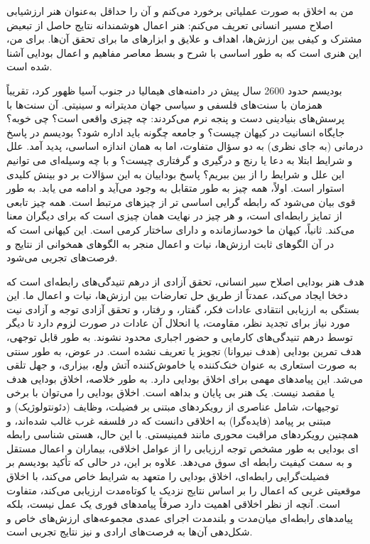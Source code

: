 من به اخلاق به صورت عملیاتی برخورد می‌کنم و آن را حداقل به‌عنوان هنر ارزشیابی اصلاح مسیر انسانی تعریف می‌کنم: هنر اعمال هوشمندانه نتایج حاصل از تبعیض مشترک و کیفی بین ارزش‌ها، اهداف و علایق و ابزارهای ما برای تحقق آن‌ها.
برای من، این هنری است که به طور اساسی با شرح و بسط معاصر مفاهیم و اعمال بودایی آشنا شده است.

بودیسم حدود 2600 سال پیش در دامنه‌های هیمالیا در جنوب آسیا ظهور کرد، تقریباً همزمان با سنت‌های فلسفی و سیاسی جهان مدیترانه و سینیتی.
آن سنت‌ها با پرسش‌های بنیادینی دست و پنجه نرم می‌کردند: چه چیزی واقعی است؟ چی خوبه؟ جایگاه انسانیت در کیهان چیست؟ و جامعه چگونه باید اداره شود؟ بودیسم در پاسخ درمانی (به جای نظری) به دو سؤال متفاوت، اما به همان اندازه اساسی، پدید آمد.
علل و شرایط ابتلا به دعا یا رنج و درگیری و گرفتاری چیست؟ و با چه وسیله‌ای می توانیم این علل و شرایط را از بین ببریم؟ پاسخ بوداییان به این سؤالات بر دو بینش کلیدی استوار است.
اولاً، همه چیز به طور متقابل به وجود می‌آید و ادامه می یابد.
به طور قوی بیان می‌شود که رابطه گرایی اساسی تر از چیزهای مرتبط است.
همه چیز تابعی از تمایز رابطه‌ای است، و هر چیز در نهایت همان چیزی است که برای دیگران معنا می‌کند.
ثانیاً، کیهان ما خودسازمانده و دارای ساختار کرمی است.
این کیهانی است که در آن الگوهای ثابت ارزش‌ها، نیات و اعمال منجر به الگوهای همخوانی از نتایج و فرصت‌های تجربی می‌شود.

هدف هنر بودایی اصلاح سیر انسانی، تحقق آزادی از درهم تنیدگی‌های رابطه‌ای است که دخخا ایجاد می‌کند، عمدتاً از طریق حل تعارضات بین ارزش‌ها، نیات و اعمال ما.
این بستگی به ارزیابی انتقادی عادات فکر، گفتار، و رفتار، و تحقق آزادی توجه و آزادی نیت مورد نیاز برای تجدید نظر، مقاومت، یا انحلال آن عادات در صورت لزوم دارد تا دیگر توسط درهم تنیدگی‌های کارمایی و حضور اجباری محدود نشوند.
به طور قابل توجهی، هدف تمرین بودایی (هدف نیروانا) تجویز یا تعریف نشده است.
در عوض، به طور سنتی به صورت استعاری به عنوان خنک‌کننده یا خاموش‌کننده آتش ولع، بیزاری، و جهل تلقی می‌شد.
این پیامدهای مهمی برای اخلاق بودایی دارد.
به طور خلاصه، اخلاق بودایی هدف یا مقصد نیست.
یک هنر بی پایان و بداهه است.
اخلاق بودایی را می‌توان با برخی توجیهات، شامل عناصری از رویکردهای مبتنی بر فضیلت، وظایف (دئونتولوژیک) و مبتنی بر پیامد (فایده‌گرا) به اخلاقی دانست که در فلسفه غرب غالب شده‌اند، و همچنین رویکردهای مراقبت محوری مانند فمینیستی.
با این حال، هستی شناسی رابطه ای بودایی به طور مشخص توجه ارزیابی را از عوامل اخلاقی، بیماران و اعمال مستقل و به سمت کیفیت رابطه ای سوق می‌دهد.
علاوه بر این، در حالی که تأکید بودیسم بر فضیلت‌گرایی رابطه‌ای، اخلاق بودایی را متعهد به شرایط خاص می‌کند، با اخلاق موقعیتی غربی که اعمال را بر اساس نتایج نزدیک یا کوتاه‌مدت ارزیابی می‌کند، متفاوت است.
آنچه از نظر اخلاقی اهمیت دارد صرفاً پیامدهای فوری یک عمل نیست، بلکه پیامدهای رابطه‌ای میان‌مدت و بلندمدت اجرای عمدی مجموعه‌های ارزش‌های خاص و شکل‌دهی آن‌ها به فرصت‌های ارادی و نیز نتایج تجربی است.
\newpage



